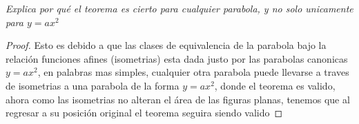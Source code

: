 \documentclass[11pt,letterpaper]{article}
\begin{document}
\begin{tcolorbox}[
	title = \textcolor{black}{\textcolor{white}{Problema 2 (Parte 3)}},]
\textit{Explica por qu\'e el teorema es cierto para cualquier parabola, y no solo unicamente para $y=ax^2$ }
\end{tcolorbox}
\begin{proof}
    Esto es debido a que las clases de equivalencia de la parabola bajo la relaci\'on funciones afines (isometrias) esta dada justo por las parabolas canonicas $y=ax^2$, en palabras mas simples, cualquier otra parabola puede llevarse a traves de isometrias a una parabola de la forma $y=ax^2$, donde el teorema es valido, ahora como las isometrias no alteran el \'area de las figuras planas, tenemos que al regresar a su posici\'on original
    el teorema seguira siendo valido
\end{proof}
\end{document}
